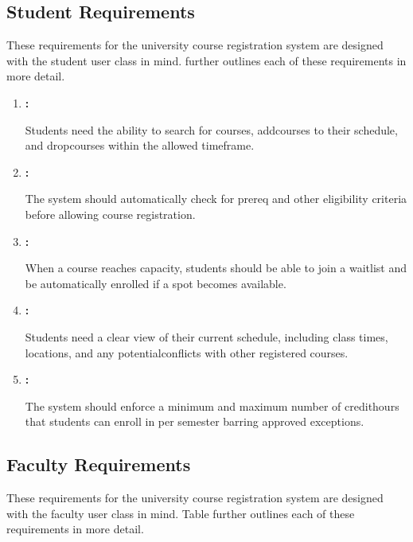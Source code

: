 \subsection{Student Requirements}
These requirements for the university course registration system are designed with the student user class in mind.  further outlines each of these requirements in more detail.
\begin{enumerate}

\item{\textbf{:}}

Students need the ability to search for courses, \gls{addcourses} to their schedule, and \gls{dropcourses} within the allowed timeframe.

\item{\textbf{:}}

The system should automatically check for \gls{prereq} and other \gls{eligibility} criteria before allowing course registration.

\item{\textbf{:}}

When a course reaches capacity, students should be able to join a \gls{waitlist} and be automatically enrolled if a spot becomes available.

\item{\textbf{:}}

Students need a clear view of their current schedule, including class times, locations, and any \gls{potentialconflicts} with other registered courses.

\item{\textbf{:}}

The system should enforce a minimum and maximum number of \gls{credithours} that students can enroll in per semester barring approved exceptions.

\end{enumerate}

\subsection{Faculty Requirements}
These requirements for the university course registration system are designed with the faculty user class in mind. Table  further outlines each of these requirements in more detail.

